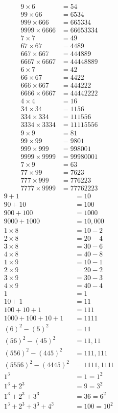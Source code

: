 \begin{align*}
9 \times 6 &= 54\\
99 \times 66 &= 6534\\
999 \times 666 &= 665334 \\
9999 \times 6666 &= 66653334\\[0.3cm]
7\times 7 &= 49\\ %
67 \times 67 &= 4489\\
667 \times 667 &= 444889 \\
6667 \times 6667 &= 44448889\\[0.3cm]
6\times 7 &= 42\\
66 \times 67 &= 4422 \\
666 \times 667 &= 444222\\
6666 \times 6667 &= 44442222\\[0.3cm]
4\times 4 &= 16\\ %
34 \times 34 &= 1156\\
334 \times 334 &= 111556\\
3334 \times 3334 &= 11115556\\[0.3cm]
9\times 9 &= 81\\ %
99\times 99&= 9801\\
999 \times 999 &= 998001\\
9999 \times 9999 &= 99980001\\[0.3cm]
7 \times 9 &= 63\\ %
77 \times 99 &= 7623\\
777 \times 999 &= 776223\\
7777 \times 9999 &= 77762223
\end{align*}
\begin{align*}
9+1 &= 10\\ 
90+10 &= 100\\
900+100 &= 1000\\
9000+1000 &= 10,000\\[0.3cm]
1 \times 8 &= 10-2 \\%
2 \times 8 &= 20-4 \\
3 \times 8 &= 30-6 \\
4 \times 8 &= 40-8 \\[0.3cm]
1 \times 9 &= 10-1\\%
2 \times 9 &= 20-2 \\
3 \times 9 &= 30-3\\
4 \times 9 &= 40-4\\[0.3cm]
1 &= 1\\%
10+1 &= 11\\
100+10+1 &= 111\\
1000+100+10+1 &= 1111\\[0.3cm]
(6)^2-(5)^2 &= 11\\%
(56)^2-(45)^2 &= 11,11\\
(556)^2-(445)^2 &= 111,111\\
(5556)^2-(4445)^2&=1111,1111\\[0.3cm]
1^3& = 1 = 1^2\\%
1^3 + 2^3 &= 9 = 3^2\\
1^3+2^3+3^3 &= 36 = 6^2\\
1^3+2^3+3^3+4^3 &= 100 = 10^2
\end{align*}
